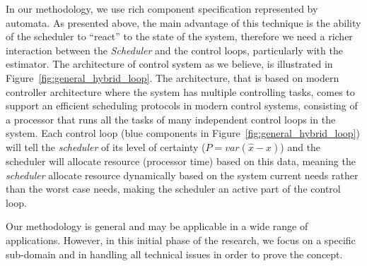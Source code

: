 \documentclass[ twoside, 12pt ]{article}
\begin{document}
In our methodology, we use rich component specification represented by automata.
As presented above, the main advantage of this technique is the ability of the scheduler to ``react'' to the state of the system, therefore we need a richer interaction between the \textit{Scheduler} and the control loops, particularly with the estimator.
The architecture of control system as we believe, is illustrated in Figure~\ref{fig:general_hybrid_loop}.
The architecture, that is based on modern controller architecture where the system has multiple controlling tasks, comes to support an efficient scheduling protocols in modern control systems, consisting of a processor that runs all the tasks of many independent control loops in the system. 
Each control loop (blue components in Figure~\ref{fig:general_hybrid_loop}) will tell the \textit{scheduler} of its level of certainty ($P = var(\hat{x} - x)$) and the scheduler will allocate resource (processor time) based on this data, meaning the \textit{scheduler} allocate resource dynamically based on the system current needs rather than the worst case needs, making the scheduler an active part of the control loop.

Our methodology is general and may be applicable in a wide range of applications. However, in this initial phase of the research, we focus on a specific sub-domain and in handling all technical issues in order to prove the concept.
\end{document}

